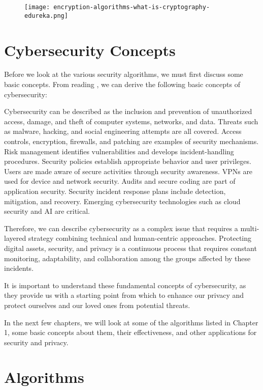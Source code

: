 \documentclass[a4paper,12pt]{report}
\begin{document}
\begin{figure}[htp]
    \centering
    \texttt{[image: encryption-algorithms-what-is-cryptography-edureka.png]}
    \label{fig: Cybersecurity-Algorithms}
\end{figure}


\chapter{Cybersecurity Concepts}

Before we look at the various security algorithms, we must first discuss some basic concepts. From reading \cite{Brij}, we can derive the following basic concepts of cybersecurity:

Cybersecurity can be described as the inclusion and prevention of unauthorized access, damage, and theft of computer systems, networks, and data. Threats such as malware, hacking, and social engineering attempts are all covered. Access controls, encryption, firewalls, and patching are examples of security mechanisms. Risk management identifies vulnerabilities and develops incident-handling procedures. Security policies establish appropriate behavior and user privileges. Users are made aware of secure activities through security awareness. VPNs are used for device and network security. Audits and secure coding are part of application security. Security incident response plans include detection, mitigation, and recovery. Emerging cybersecurity technologies such as cloud security and AI are critical.

Therefore, we can describe cybersecurity as a complex issue that requires a multi-layered strategy combining technical and human-centric approaches. Protecting digital assets, security, and privacy is a continuous process that requires constant monitoring, adaptability, and collaboration among the groups affected by these incidents.

It is important to understand these fundamental concepts of cybersecurity, as they provide us with a starting point from which to enhance our privacy and protect ourselves and our loved ones from potential threats.

In the next few chapters, we will look at some of the algorithms listed in Chapter 1, some basic concepts about them, their effectiveness, and other applications for security and privacy.

\chapter{Algorithms}
\end{document}
